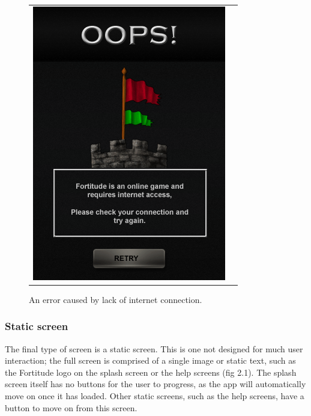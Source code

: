 \begin{figure}[h!]
\begin{tabular}{cc}
\begin{minipage}{0.3\textwidth}
\begin{center}
\begin{minipage}{0.83\textwidth}
		\includegraphics[width=\textwidth]{images/error_mockup}
	\caption{An error caused by lack of internet connection.}
	\label{no_internet}
		\end{minipage}
		\end{center}
	\end{minipage}
	
\end{tabular}
\vspace{-0pt}
\end{figure}

\subsubsection{Static screen}

The final type of screen is a static screen. This is one not designed for much user interaction; the full screen is comprised of a single image or static text, such as the Fortitude logo on the splash screen or the help screens (fig 2.1). The splash screen itself has no buttons for the user to progress, as the app will automatically move on once it has loaded. Other static screens, such as the help screens, have a button to move on from this screen.

